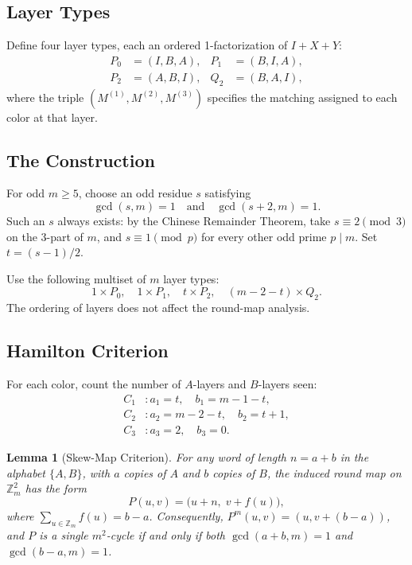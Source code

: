 \documentclass[11pt]{article}
\newtheorem{lemma}[theorem]{Lemma}
\theoremstyle{definition}
\theoremstyle{remark}
\newcommand{\Zm}{\mathbb{Z}_m}
\begin{document}
\subsection{Layer Types}

Define four layer types, each an ordered 1-factorization of $I + X + Y$:
\begin{align}
    P_0 &= (I, B, A), & P_1 &= (B, I, A), \\
    P_2 &= (A, B, I), & Q_2 &= (B, A, I),
\end{align}
where the triple $(M^{(1)}, M^{(2)}, M^{(3)})$ specifies the matching assigned to each color at that layer.

\subsection{The Construction}

For odd $m \geq 5$, choose an odd residue $s$ satisfying
\begin{equation}
    \gcd(s, m) = 1 \quad \text{and} \quad \gcd(s+2, m) = 1.
    \label{eq:gcd-condition}
\end{equation}
Such an $s$ always exists: by the Chinese Remainder Theorem, take $s \equiv 2 \pmod{3}$ on the 3-part of $m$, and $s \equiv 1 \pmod{p}$ for every other odd prime $p \mid m$. Set $t = (s-1)/2$.

Use the following multiset of $m$ layer types:
\begin{equation}
    1 \times P_0, \quad 1 \times P_1, \quad t \times P_2, \quad (m - 2 - t) \times Q_2.
    \label{eq:odd-schedule}
\end{equation}
The ordering of layers does not affect the round-map analysis.

\subsection{Hamilton Criterion}

For each color, count the number of $A$-layers and $B$-layers seen:
\begin{align}
    C_1 &: a_1 = t, \quad b_1 = m - 1 - t, \\
    C_2 &: a_2 = m - 2 - t, \quad b_2 = t + 1, \\
    C_3 &: a_3 = 2, \quad b_3 = 0.
\end{align}

\begin{lemma}[Skew-Map Criterion]
\label{lem:skew}
For any word of length $n = a + b$ in the alphabet $\{A, B\}$, with $a$ copies of $A$ and $b$ copies of $B$, the induced round map on $\Zm^2$ has the form
\begin{equation}
    P(u, v) = \bigl(u + n, \; v + f(u)\bigr),
\end{equation}
where $\sum_{u \in \Zm} f(u) = b - a$. Consequently, $P^m(u,v) = (u, v + (b-a))$, and $P$ is a single $m^2$-cycle if and only if both $\gcd(a+b, m) = 1$ and $\gcd(b-a, m) = 1$.
\end{lemma}
\end{document}
